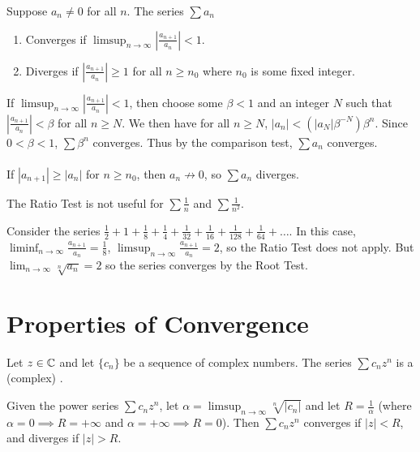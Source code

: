 \documentclass{mathnotes}
\begin{document}
\begin{thm}
  Suppose $a_n\neq0$ for all $n$. The series $\sum a_n$
  \begin{enumerate}
    \item Converges if $\limsup_{n\to\infty}|\frac{a_{n+1}}{a_n}|<1$.
    \item Diverges if $|\frac{a_{n+1}}{a_n}|\ge1$ for all $n\ge n_0$ where
      $n_0$ is some fixed integer.
  \end{enumerate}
\end{thm}

\begin{pf}
  If $\limsup_{n\to\infty}|\frac{a_{n+1}}{a_n}|<1$, then choose some $\beta<1$
  and an integer $N$ such that $|\frac{a_{n+1}}{a_n}|<\beta$ for all $n\ge N$.
  We then have for all $n\ge N$, $|a_n|<(|a_N|\beta^{-N})\beta^n$. Since
  $0<\beta<1$, $\sum\beta^n$ converges. Thus by the comparison test, $\sum a_n$
  converges.\\\\
  If $|a_{n+1}|\ge|a_n|$ for $n\ge n_0$, then $a_n\not\to0$, so $\sum a_n$
  diverges.
\end{pf}

\begin{note}
  The Ratio Test is not useful for $\sum\frac{1}{n}$ and $\sum\frac{1}{n^2}$.
\end{note}

\begin{ex}
  Consider the series $\frac{1}{2}+1+\frac{1}{8}+\frac{1}{4}+\frac{1}{32}
  +\frac{1}{16}+\frac{1}{128}+\frac{1}{64}+\ldots$. In this case,
  $\liminf_{n\to\infty}\frac{a_{n+1}}{a_n}=\frac{1}{8}$,
  $\limsup_{n\to\infty}\frac{a_{n+1}}{a_n}=2$, so the Ratio Test does not
  apply. But $\lim_{n\to\infty}\sqrt[n]{a_n}=2$ so the series converges by the
  Root Test.
\end{ex}

\section*{Properties of Convergence}

\begin{defi}
  Let $z\in\mathbb{C}$ and let $\{c_n\}$ be a sequence of complex numbers. The series
  $\sum c_nz^n$ is a (complex) .
\end{defi}

\begin{prop}
  Given the power series $\sum c_nz^n$, let
  $\alpha=\limsup_{n\to\infty}\sqrt[n]{|c_n|}$ and let $R=\frac{1}{\alpha}$
  (where $\alpha=0\implies R=+\infty$ and $\alpha=+\infty\implies R=0$). Then
  $\sum c_nz^n$ converges if $|z|<R$, and diverges if $|z|>R$.
\end{prop}
\end{document}
